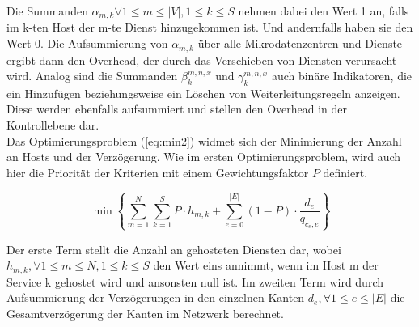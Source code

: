 \documentclass[conference]{IEEEtran}
\begin{document}
Die Summanden \(\alpha_{m,k} \forall 1\le m \le |V|, 1 \le k \le S\) nehmen dabei den Wert 1 an, falls im k-ten Host der m-te Dienst hinzugekommen ist. Und andernfalls haben sie den Wert 0. Die Aufsummierung von \(\alpha_{m,k}\) über alle Mikrodatenzentren und Dienste ergibt dann den Overhead, der durch das Verschieben von Diensten verursacht wird. 
Analog sind die Summanden \(\beta_{k}^{m,n,x}\) und \(\gamma_{k}^{m,n,x}\) auch binäre Indikatoren, die ein Hinzufügen beziehungsweise ein Löschen von Weiterleitungsregeln anzeigen. Diese werden ebenfalls aufsummiert und stellen den Overhead in der Kontrollebene dar.\\
Das Optimierungsproblem (\ref{eq:min2}) widmet sich der Minimierung der Anzahl an Hosts und der Verzögerung. Wie im ersten Optimierungsproblem, wird auch hier die Priorität der Kriterien mit einem Gewichtungsfaktor \(P\) definiert.

\begin{equation}
\min \left\{ \sum_{m=1}^N \sum_{k=1}^S P \cdot h_{m,k} + \sum_{e=0}^{|E|} (1-P) \cdot \frac{d_e}{q_{c_{e},e}} \right\}
\label{eq:min2}
\end{equation}

Der erste Term stellt die Anzahl an gehosteten Diensten dar, wobei \(h_{m,k},\forall 1 \le m \le N, 1\le k \le S\) den Wert eins annimmt, wenn im Host m der Service k gehostet wird und ansonsten null ist.
Im zweiten Term wird durch Aufsummierung der Verzögerungen in den einzelnen Kanten \(d_e, \forall 1 \le e \le |E|\) die Gesamtverzögerung der Kanten im Netzwerk berechnet.
\end{document}

